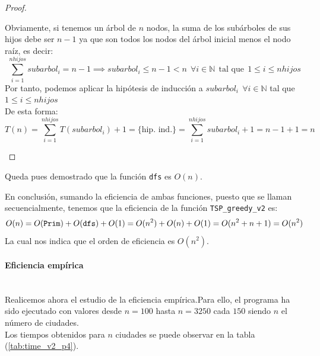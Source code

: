 \documentclass{article}
\newcommand{\myparagraph}[1]{\paragraph{#1}\mbox{}\\}
\begin{document}
\begin{itemize}
\begin{teo}
\begin{proof}
\begin{itemize}
            Obviamente, si tenemos un árbol de $n$ nodos, la suma de los subárboles de sus hijos debe ser $n-1$ ya que son todos los nodos del árbol inicial menos el nodo raíz, es decir: $$ \sum^{nhijos}_{i=1} subarbol_i = n - 1 \implies subarbol_i \leq n-1 < n \:\: \forall i \in \mathbb{N} \:\: \text{tal que} \:\: 1 \leq i \leq nhijos$$
            Por tanto, podemos aplicar la hipótesis de inducción a $subarbol_i \:\: \forall i \in \mathbb{N}$ tal que $1 \leq i \leq nhijos$\\
            De esta forma:
            $$
            T(n) = \sum^{nhijos}_{i=1} T(subarbol_i) + 1 = \{\text{hip. ind.}\} = \sum^{nhijos}_{i=1} subarbol_i + 1 = n - 1 + 1 = n
            $$
        \end{itemize}
    \end{proof}
    \end{teo}
    Queda pues demostrado que la función \verb|dfs| es $O(n)$.
\end{itemize}
En conclusión, sumando la eficiencia de ambas funciones, puesto que se llaman secuencialmente, tenemos que la eficiencia de la función \verb|TSP_greedy_v2| es:
$$
O(n) = O(\verb|Prim|) + O(\verb|dfs|) + O(1) = O(n^{2}) + O(n) + O(1) = O(n^{2} + n + 1) = O(n^{2})
$$
La cual nos indica que el orden de eficiencia es $O(n^{2})$.
\myparagraph{Eficiencia empírica}
Realicemos ahora el estudio de la eficiencia empírica.Para ello, el programa ha sido ejecutado con valores desde  $n = 100$ hasta $n = 3250$ cada $150$ siendo $n$ el número de ciudades.\\
Los tiempos obtenidos para $n$ ciudades se puede observar en la tabla (\ref{tab:time_v2_p4}).
\end{document}
